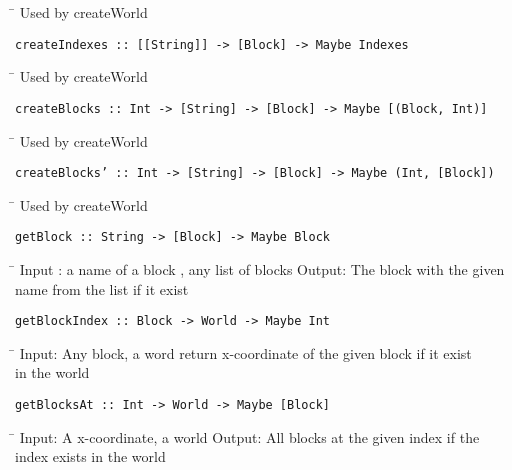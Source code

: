 \begin{tabbing}
\hspace*{1cm}\= \kill
\> Used by createWorld
\end{tabbing}
\begin{verbatim}
createIndexes :: [[String]] -> [Block] -> Maybe Indexes
\end{verbatim}
\begin{tabbing}
\hspace*{1cm}\= \kill
\> Used by createWorld
\end{tabbing}
\begin{verbatim}
createBlocks :: Int -> [String] -> [Block] -> Maybe [(Block, Int)]
\end{verbatim}
\begin{tabbing}
\hspace*{1cm}\= \kill
\> Used by createWorld
\end{tabbing}
\begin{verbatim}
createBlocks’ :: Int -> [String] -> [Block] -> Maybe (Int, [Block])
\end{verbatim}
\begin{tabbing}
\hspace*{1cm}\= \kill
\> Used by createWorld
\end{tabbing}
\begin{verbatim}
getBlock :: String -> [Block] -> Maybe Block
\end{verbatim}
\begin{tabbing}
\hspace*{1cm}\= \kill
\> Input : a name of a block , any list of blocks Output: The block with the given \\
\> name from the list if it exist
\end{tabbing}
\begin{verbatim}
getBlockIndex :: Block -> World -> Maybe Int
\end{verbatim}
\begin{tabbing}
\hspace*{1cm}\= \kill
\> Input: Any block, a word return x-coordinate of the given block if it exist \\
\> in the world
\end{tabbing}
\begin{verbatim}
getBlocksAt :: Int -> World -> Maybe [Block]
\end{verbatim}
\begin{tabbing}
\hspace*{1cm}\= \kill
\> Input: A x-coordinate, a world Output: All blocks at the given index if the \\
\> index exists in the world
\end{tabbing}
